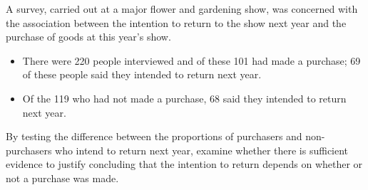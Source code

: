 \item 
A survey, carried out at a major flower and gardening show, was concerned with the association between the intention to return to the show next year and the purchase of goods at this year's show.
\begin{itemize}
\item There were 220 people interviewed and of these 101 had made a purchase; 69 of these people said they intended to return next year. 
\item Of the 119 who had not made a purchase, 68 said they intended to return next year.
\end{itemize}
By testing the difference between the proportions of purchasers and non-purchasers who intend to return next year, examine whether there is sufficient evidence to justify concluding that the intention to return depends on whether or not a purchase was made.
